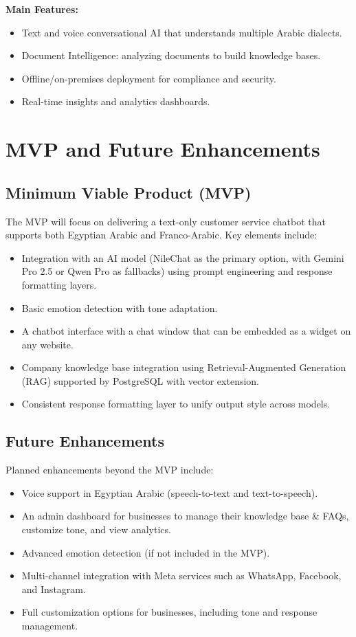\documentclass[20pt,a4paper]{article}
\begin{document}
\textbf{Main Features:}
\begin{itemize}
    \item Text and voice conversational AI that understands multiple Arabic dialects.
    \item Document Intelligence: analyzing documents to build knowledge bases.
    \item Offline/on-premises deployment for compliance and security.
    \item Real-time insights and analytics dashboards.
\end{itemize}
\section{MVP and Future Enhancements}

\subsection*{Minimum Viable Product (MVP)}
The MVP will focus on delivering a text-only customer service chatbot that supports both Egyptian Arabic and Franco-Arabic. Key elements include:  

\begin{itemize}
  \item Integration with an AI model (NileChat as the primary option, with Gemini Pro 2.5 or Qwen Pro as fallbacks) using prompt engineering and response formatting layers.  
  \item Basic emotion detection with tone adaptation.  
  \item A chatbot interface with a chat window that can be embedded as a widget on any website.  
  \item Company knowledge base integration using Retrieval-Augmented Generation (RAG) supported by PostgreSQL with vector extension.  
  \item Consistent response formatting layer to unify output style across models.  
\end{itemize}

\subsection*{Future Enhancements}
Planned enhancements beyond the MVP include:  

\begin{itemize}
  \item Voice support in Egyptian Arabic (speech-to-text and text-to-speech).  
  \item An admin dashboard for businesses to manage their knowledge base \& FAQs, customize tone, and view analytics.  
  \item Advanced emotion detection (if not included in the MVP).  
  \item Multi-channel integration with Meta services such as WhatsApp, Facebook, and Instagram.  
  \item Full customization options for businesses, including tone and response management.  
\end{itemize}
\end{document}
